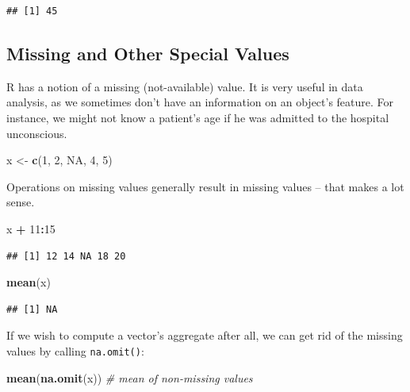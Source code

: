 \documentclass[10pt,b5paper,krantz1]{krantz}
\newenvironment{Shaded}{\begin{snugshade}}{\end{snugshade}}
\newcommand{\CommentTok}[1]{\textcolor[rgb]{0.37,0.37,0.37}{\textit{#1}}}
\newcommand{\DecValTok}[1]{\textcolor[rgb]{0.06,0.06,0.06}{#1}}
\newcommand{\KeywordTok}[1]{\textcolor[rgb]{0.27,0.27,0.27}{\textbf{#1}}}
\newcommand{\NormalTok}[1]{#1}
\newcommand{\OperatorTok}[1]{\textcolor[rgb]{0.43,0.43,0.43}{\textbf{#1}}}
\newcommand{\OtherTok}[1]{\textcolor[rgb]{0.37,0.37,0.37}{#1}}
\newcommand{\StringTok}[1]{\textcolor[rgb]{0.5,0.5,0.5}{#1}}
\begin{document}
\begin{verbatim}
## [1] 45
\end{verbatim}

\hypertarget{missing-and-other-special-values}{%
\subsection{Missing and Other Special Values}\label{missing-and-other-special-values}}

R has a notion of a missing (not-available) value.
It is very useful in data analysis, as we sometimes don't have an information
on an object's feature. For instance, we might not know a patient's age
if he was admitted to the hospital unconscious.

\begin{Shaded}
\begin{Highlighting}[]
\NormalTok{x <-}\StringTok{ }\KeywordTok{c}\NormalTok{(}\DecValTok{1}\NormalTok{, }\DecValTok{2}\NormalTok{, }\OtherTok{NA}\NormalTok{, }\DecValTok{4}\NormalTok{, }\DecValTok{5}\NormalTok{)}
\end{Highlighting}
\end{Shaded}

Operations on missing values generally result in missing values --
that makes a lot sense.

\begin{Shaded}
\begin{Highlighting}[]
\NormalTok{x }\OperatorTok{+}\StringTok{ }\DecValTok{11}\OperatorTok{:}\DecValTok{15}
\end{Highlighting}
\end{Shaded}

\begin{verbatim}
## [1] 12 14 NA 18 20
\end{verbatim}

\begin{Shaded}
\begin{Highlighting}[]
\KeywordTok{mean}\NormalTok{(x)}
\end{Highlighting}
\end{Shaded}

\begin{verbatim}
## [1] NA
\end{verbatim}

If we wish to compute a vector's aggregate after all,
we can get rid of the missing values by calling \texttt{na.omit()}:

\begin{Shaded}
\begin{Highlighting}[]
\KeywordTok{mean}\NormalTok{(}\KeywordTok{na.omit}\NormalTok{(x)) }\CommentTok{# mean of non-missing values}
\end{Highlighting}
\end{Shaded}
\end{document}
